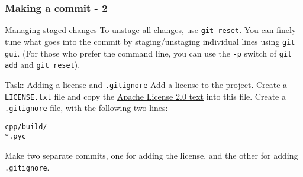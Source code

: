 \begin{frame}[fragile]

\frametitle{Making a commit - 2}

\begin{block}{Managing staged changes}
	To unstage all changes, use \texttt{git reset}. You can finely tune what goes into the commit by staging/unstaging individual lines using \texttt{git gui}. (For those who prefer the command line, you can use the \texttt{-p} switch of \texttt{git add} and \texttt{git reset}).
\end{block}

\begin{block}{Task: Adding a license and \texttt{.gitignore}}
	Add a license to the project. Create a \texttt{LICENSE.txt} file and copy the \href{https://choosealicense.com/licenses/apache-2.0/}{Apache License 2.0 text} into this file. Create a \texttt{.gitignore} file, with the following two lines:
	\begin{verbatim}
cpp/build/
*.pyc
	\end{verbatim}
Make two separate commits, one for adding the license, and the other for adding \texttt{.gitignore}.
\end{block}
	
\end{frame}


